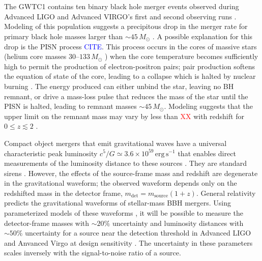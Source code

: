 \documentclass[modern]{aastex62}
\newcommand{\citationhere}{\textcolor{blue}{CITE}}
\newcommand{\fixme}[1]{\textcolor{red}{#1}}
\newcommand{\MPISN}{45 \, \MSun{}}
\newcommand{\MSun}{M_\odot}
\begin{document}
\section*{ }

The \ac{GWTC1} contains ten binary black hole merger events observed during
Advanced LIGO and Advanced VIRGO's first and second observing runs
\citep{GWTC-1}. Modeling of this population suggests a precipitous drop in the
merger rate for primary black hole masses larger than $\sim \MPISN{}$
\citep{Fishbach2017,GWTC-1}.  A possible explanation for this drop is the
\ac{PISN} process \citationhere{}. This process occurs in the cores of massive
stars (helium core masses $30$--$133 \, \MSun$ \citep{Woosley2017}) when the
core temperature becomes sufficiently high to permit the production of
electron-positron pairs; pair production softens the equation of state of the
core, leading to a collapse which is halted by nuclear burning
\citep{Heger2002}.  The energy produced can either unbind the star, leaving no
\ac{BH} remnant, or drive a mass-loss pulse that reduces the mass of the star
until the \ac{PISN} is halted, leading to remnant masses $\sim \MPISN{}$.
Modeling suggests that the upper limit on the remnant mass may vary by less than
\fixme{XX} with redshift for $0 \leq z \lesssim 2$ \citep{Belczynski2016}.

Compact object mergers that emit gravitational waves have a universal
characteristic peak luminosity $c^5/G \simeq 3.6 \times 10^{59} \, \mathrm{erg}
\, \mathrm{s}^{-1}$ that enables direct measurements of the luminosity distance
to these sources \citep{Schutz1986}.  They are standard sirens \citep{Holz2005}.
However, the effects of the source-frame mass and redshift are degenerate in the
gravitational waveform; the observed waveform depends only on the redshifted
mass in the detector frame, $m_\mathrm{det} = m_\mathrm{source} (1 + z)$.
General relativity predicts the gravitational waveforms of stellar-mass \ac{BBH}
mergers.  Using parameterized models of these waveforms
\citep{Taracchini2014,Kahn2016,Bohe2017,Chatziioannou2017}, it will be possible
to measure the detector-frame masses with $\sim 20\%$ uncertainty and luminosity
distances \citep{Hogg1999} with $\sim 50\%$ uncertainty for a source near the
detection threshold in Advanced LIGO and Anvanced Virgo at design sensitivity
\citep{Vitale2017}.  The uncertainty in these parameters scales inversely with
the signal-to-noise ratio of a source.
\end{document}
